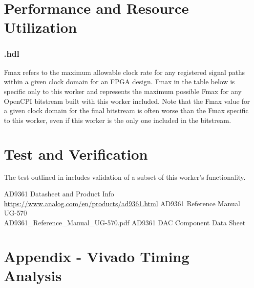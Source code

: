 \section*{Performance and Resource Utilization}
\subsubsection*{\comp.hdl}
Fmax refers to the maximum allowable clock rate for any registered signal paths within a given clock domain for an FPGA design. Fmax in the table below is specific only to this worker and represents the maximum possible Fmax for any OpenCPI bitstream built with this worker included. Note that the Fmax value for a given clock domain for the final bitstream is often worse than the Fmax specific to this worker, even if this worker is the only one included in the bitstream.

%



\section*{Test and Verification}
The test outlined in \cite{dac_comp_datasheet} includes validation of a subset of this worker's functionality.

\begin{thebibliography}{1}

 AD9361 Datasheet and Product Info \\
\url{https://www.analog.com/en/products/ad9361.html}
 AD9361 Reference Manual UG-570\\
AD9361\_Reference\_Manual\_UG-570.pdf
  AD9361 DAC Component Data Sheet \\

\end{thebibliography}
\pagebreak
\section{Appendix - Vivado Timing Analysis} \label{appendix}

